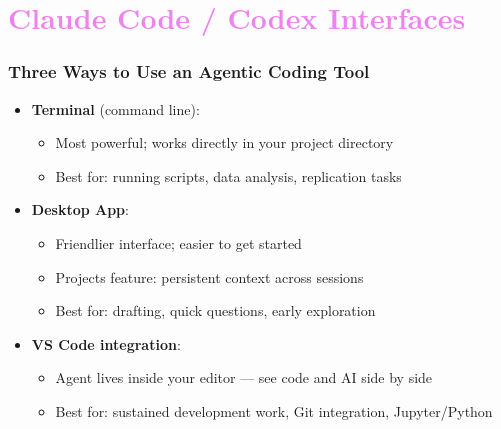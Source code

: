\documentclass[aspectratio=169, 12pt]{beamer}
\begin{document}
\section{\textcolor{violet}{Claude Code / Codex Interfaces \vspace{0.3in}}}

\begin{frame}
\frametitle{Three Ways to Use an Agentic Coding Tool}

\begin{itemize}
    \item \textbf{Terminal} (command line):
        \begin{itemize}
            \item[$\circ$] Most powerful; works directly in your project directory
            \item[$\circ$] Best for: running scripts, data analysis, replication tasks
        \end{itemize}
    \item \textbf{Desktop App}:
        \begin{itemize}
            \item[$\circ$] Friendlier interface; easier to get started
            \item[$\circ$] Projects feature: persistent context across sessions
            \item[$\circ$] Best for: drafting, quick questions, early exploration
        \end{itemize}
    \item \textbf{VS Code integration}:
        \begin{itemize}
            \item[$\circ$] Agent lives inside your editor --- see code and AI side by side
            \item[$\circ$] Best for: sustained development work, Git integration, Jupyter/Python
        \end{itemize}
\end{itemize}

\end{frame}
\end{document}
